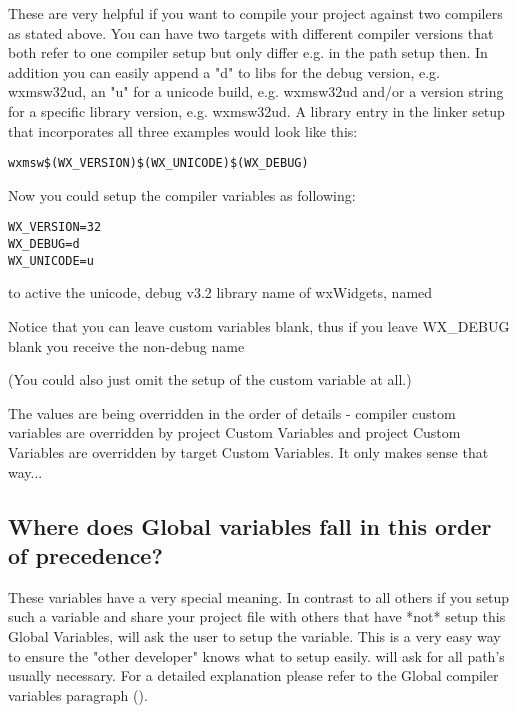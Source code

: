 These are very helpful if you want to compile your project against two compilers as stated above. 
You can have two targets with different compiler versions that both refer to one compiler setup but only differ e.g. in the path setup then. 
In addition you can easily append a "d" to libs for the debug version, e.g. wxmsw32ud, an "u" for a unicode build, e.g. wxmsw32ud and/or a version string for a specific library version, 
e.g. wxmsw32ud. \newline
A library entry in the linker setup that incorporates all three examples would look like this:
\begin{verbatim}
wxmsw$(WX_VERSION)$(WX_UNICODE)$(WX_DEBUG)
\end{verbatim}

Now you could setup the compiler variables as following:
\begin{verbatim}
WX_VERSION=32
WX_DEBUG=d
WX_UNICODE=u
\end{verbatim}
to active the unicode, debug v3.2 library name of wxWidgets, named


Notice that you can leave custom variables blank, thus if you leave WX\_DEBUG blank you receive the non-debug name


(You could also just omit the setup of the custom variable at all.)

The values are being overridden in the order of details - compiler custom variables are overridden by project Custom Variables and project Custom Variables are overridden by target Custom Variables. It only makes sense that way... 

\subsection{Where does Global variables fall in this order of precedence?}

These variables have a very special meaning. In contrast to all others if you setup such a variable and share your project file with others that have *not* setup this Global Variables, \codeblocks 
will ask the user to setup the variable. This is a very easy way to ensure the "other developer" knows what to setup easily. \codeblocks will ask for all path's usually necessary.\newline
For a detailed explanation please refer to the Global compiler variables paragraph (). 
